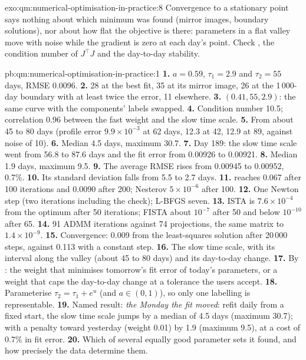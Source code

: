 \begin{solution}{exo:qm:numerical-optimisation-in-practice:8}
Convergence to a stationary point says nothing about which minimum was found (mirror images, boundary solutions), nor about how flat the objective is there: parameters in a flat valley move
with noise while the gradient is zero at each day's point. Check , the condition number of $J^\top J$ and the day-to-day stability.
\end{solution}

\begin{solution}{pb:qm:numerical-optimisation-in-practice:1}
\textbf{1.} $a = 0.59$, $\tau_1 = 2.9$ and $\tau_2 = 55$ days, RMSE 0.0096.
\textbf{2.} 28 at the best fit, 35 at its mirror image, 26 at the 1\,000-day boundary with at least twice the error, 11 elsewhere.
\textbf{3.} $(0.41, 55, 2.9)$: the same curve with the components' labels swapped.
\textbf{4.} Condition number 10.5; correlation 0.96 between the fast weight and the slow time scale.
\textbf{5.} From about 45 to 80 days (profile error $9.9 \times 10^{-3}$ at 62 days, 12.3 at 42, 12.9 at 89, against noise of 10).
\textbf{6.} Median 4.5 days, maximum 30.7.
\textbf{7.} Day 189: the slow time scale went from 56.8 to 87.6 days and the fit error from 0.00926 to 0.00921.
\textbf{8.} Median 1.9 days, maximum 9.5.
\textbf{9.} The average RMSE rises from 0.00945 to 0.00952, 0.7\%.
\textbf{10.} Its standard deviation falls from 5.5 to 2.7 days.
\textbf{11.}  reaches 0.067 after 100 iterations and 0.0090 after 200; Nesterov $5 \times 10^{-6}$ after 100.
\textbf{12.} One Newton step (two iterations including the check); L-BFGS seven.
\textbf{13.} ISTA is $7.6 \times 10^{-4}$ from the optimum after 50 iterations; FISTA about $10^{-7}$ after 50 and below $10^{-10}$ after 65.
\textbf{14.} 91 ADMM iterations against 74 projections, the same matrix to $1.4 \times 10^{-9}$.
\textbf{15.} Convergence: 0.009 from the least-squares solution after 20\,000 steps, against 0.113 with a constant step.
\textbf{16.} The slow time scale, with its interval along the valley (about 45 to 80 days) and its day-to-day change.
\textbf{17.} By : the weight that minimises tomorrow's fit error of today's parameters, or a weight that caps the day-to-day change at a tolerance the users accept.
\textbf{18.} Parameterise $\tau_2 = \tau_1 + e^u$ (and $a \in (0, 1)$), so only one labelling is representable.
\textbf{19.} Named result: \emph{the Monday the fit moved}: refit daily from a fixed start, the slow time scale jumps by a median of 4.5 days (maximum 30.7); with a penalty toward yesterday (weight
0.01) by 1.9 (maximum 9.5), at a cost of 0.7\% in fit error.
\textbf{20.} Which of several equally good parameter sets it found, and how precisely the data determine them.
\end{solution}

